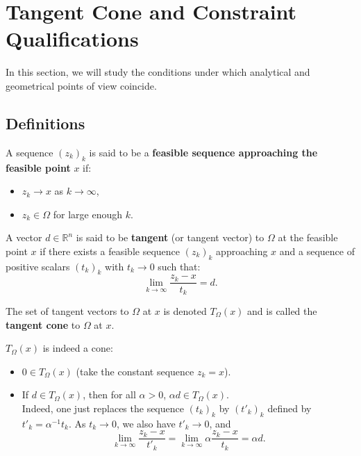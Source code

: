 \section{Tangent Cone and Constraint Qualifications}

In this section, we will study the conditions under which analytical and geometrical points of view coincide.

\subsection{Definitions}

\begin{definition}
    A sequence $(z_k)_k$ is said to be a \textbf{feasible sequence approaching the feasible point} $x$ if:
    \begin{itemize}
        \item $z_k \to x$ as $k \to \infty$,
        \item $z_k \in \Omega$ for large enough $k$.
    \end{itemize}
\end{definition}

\begin{definition}
    A vector $d \in \mathbb{R}^n$ is said to be \textbf{tangent} (or tangent vector) to $\Omega$ at the feasible point $x$ if there exists a feasible sequence $(z_k)_k$ approaching $x$ and a sequence of positive scalars $(t_k)_k$ with $t_k \to 0$ such that:
    \begin{equation}
        \lim_{k \to \infty} \frac{z_k - x}{t_k} = d.
    \end{equation}
\end{definition}



The set of tangent vectors to $\Omega$ at $x$ is denoted $T_\Omega(x)$ and is called the \textbf{tangent cone} to $\Omega$ at $x$.

\begin{remarque}
    $T_\Omega(x)$ is indeed a cone:
    \begin{itemize}
        \item $0 \in T_\Omega(x)$ (take the constant sequence $z_k = x$).
        \item If $d \in T_\Omega(x)$, then for all $\alpha > 0$, $\alpha d \in T_\Omega(x)$. \\
        Indeed, one just replaces the sequence $(t_k)_k$ by $(t'_k)_k$ defined by $t'_k = \alpha^{-1} t_k$. As $t_k \to 0$, we also have $t'_k \to 0$, and
        \[ \lim_{k \to \infty} \frac{z_k - x}{t'_k} = \lim_{k \to \infty} \alpha \frac{z_k - x}{t_k} = \alpha d. \]
    \end{itemize}
\end{remarque}

